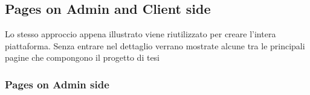







\subsection {Pages on Admin and Client side}
\label{subsec:pages}
Lo stesso approccio appena illustrato viene riutilizzato per creare l'intera piattaforma.
Senza entrare nel dettaglio verrano mostrate alcune tra le principali pagine che compongono il progetto di tesi

\subsubsection {Pages on Admin side}
\label{subsec:Admin_side}


